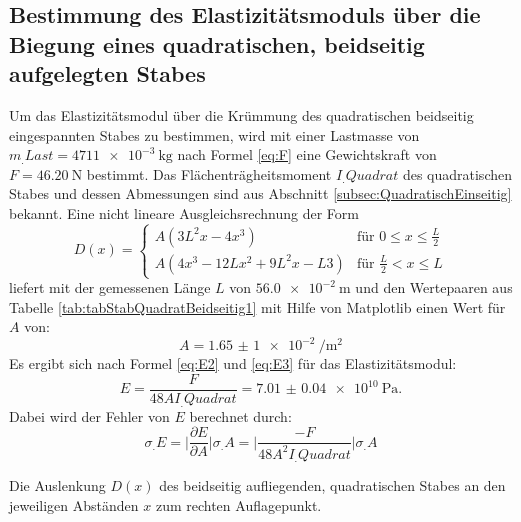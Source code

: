 \subsection{Bestimmung des Elastizitätsmoduls über die Biegung eines quadratischen, beidseitig aufgelegten Stabes}

Um das Elastizitätsmodul über die Krümmung des quadratischen beidseitig eingespannten Stabes zu bestimmen, wird mit einer Lastmasse von $m_.{Last} = \SI{4711e-3}{\kilogram}$ nach Formel \eqref{eq:F} eine Gewichtskraft von $F=\SI{46.20}{\newton}$ bestimmt.
Das Flächenträgheitsmoment $I_.{Quadrat}$ des quadratischen Stabes und dessen Abmessungen sind aus Abschnitt \ref{subsec:QuadratischEinseitig} bekannt.
Eine nicht lineare Ausgleichsrechnung der Form
\begin{equation*}
	D(x) =
	\begin{cases}
	A\left(3L^2 x-4x^3\right)& \text{für }0\leq x \leq \frac{L}{2} \\
	A\left(4 x^3 -12 L x^2 + 9 L^2 x -L 3 \right)& \text{für }\frac{L}{2} < x \leq L
	\end{cases} \label{FunktionBeidseitig}
\end{equation*}
liefert mit der gemessenen Länge $L$ von $\SI{56.0e-2}{\metre}$ und den Wertepaaren aus Tabelle \ref{tab:tabStabQuadratBeidseitig1} mit Hilfe von Matplotlib \cite{matplotlib} einen Wert für $A$ von:
\[
	A = \SI{1,65(1)e-2}{\per\metre\squared}
\]
Es ergibt sich nach Formel \eqref{eq:E2} und \eqref{eq:E3} für das Elastizitätsmodul:
\[
	E = \frac{F}{48AI_.{Quadrat}} = \SI{7.01(4)e10}{\pascal}\text{.}
\]
Dabei wird der Fehler von $E$ berechnet durch:
\begin{equation}
	\sigma_.E = \biggl|\frac{\partial E}{\partial A}\biggl|\sigma_.A = \biggl|\frac{-F}{48A^2I_.{Quadrat}}\biggl|\sigma_.A \label{eq:sigma_E}
\end{equation}
\begin{table}
	\caption{Die Auslenkung $D(x)$ des beidseitig aufliegenden, quadratischen Stabes an den jeweiligen Abständen $x$ zum rechten Auflagepunkt.}
	\begin{minipage}[c]{0.5\textwidth}
		\centering
		
	\end{minipage}
	\begin{minipage}[c]{0.5\textwidth}
		\centering
		
	\end{minipage}
\end{table}
